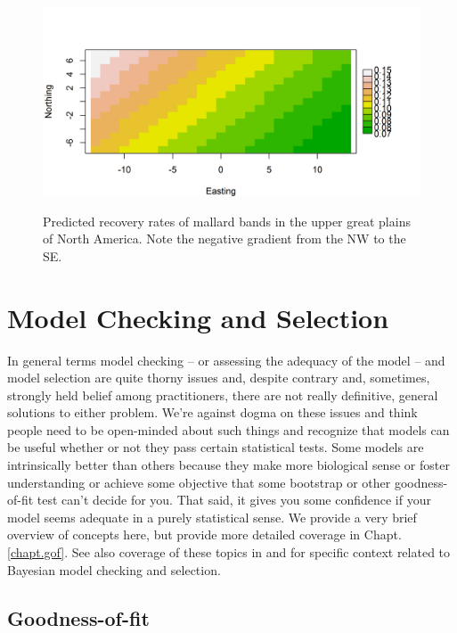\begin{figure}
\begin{center}
\includegraphics[height=2.5in]{Ch3-Bayes/figs/mallard_gradient}
\end{center}
\caption{Predicted recovery rates of mallard bands in the upper great
  plains of North America. Note the negative gradient from the NW to
  the SE.}
\label{glms.fig.bandrecovery}
\end{figure}

\section{Model Checking and Selection}
\label{glms.sec.modsel}

In general terms model checking -- or assessing the adequacy of the
model -- and model selection are quite thorny issues and, despite
contrary and, sometimes, strongly held belief among practitioners, there are not
really definitive, general solutions to either problem. We're against
dogma on these issues and think people need to be open-minded about
such things and recognize that models can be useful whether or not
they pass certain statistical tests. Some models are intrinsically
better than others because they make more biological sense or foster
understanding or achieve some objective that some  bootstrap
or other goodness-of-fit test can't decide for you. That said, it
gives you some confidence if your model seems adequate in a purely statistical
sense.
We provide a very brief overview of concepts here, but provide more
detailed coverage in Chapt. \ref{chapt.gof}.
See also coverage of these topics in
\citet[][]{kery:2010} and
\citet[][]{link_barker:2010}
for specific context related to Bayesian
model checking and selection.

\subsection{Goodness-of-fit}
\label{glms.sec.gof}

